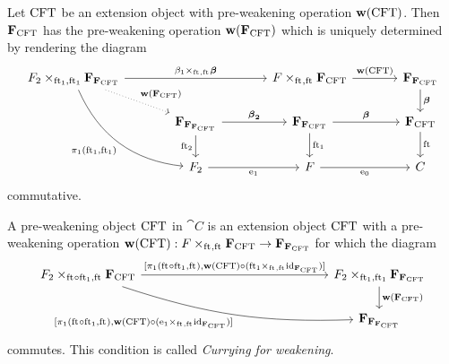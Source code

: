 \begin{defn}
Let $\mathrm{CFT}$ be an extension object with pre-weakening operation
$\mathbf{w}(\mathrm{CFT})$. Then $\mathbf{F}_{\mathrm{CFT}}$ has the pre-weakening operation
$\mathbf{w}(\mathbf{F}_{\mathrm{CFT}})$ which is uniquely determined by rendering the
diagram
\begin{equation*}
\begin{tikzcd}[column sep=large]
\cobesys{\stesysf_2}{\famesys{\famesys{\stesys}}}{\eft[1]}{\eft[1]}
  \ar{rr}{%
      \pullback{\beta_1}{\boldsymbol{\beta}}{\eft}{\eft}
    }
  \ar[bend right]{ddr}[swap]{\pullbackpr{1}{\eft[1]}{\eft[1]}}
  \ar[dotted]{dr}{\mathbf{w}(\famesys{\stesys})}
  &
  {}&
\cobesys{\stesysf}{\famesys{\stesys}}{\eft}{\eft}
  \ar{r}{\mathbf{w}(\stesys)}
  &
\famesys{\famesys{\stesys}}
  \ar{d}{\boldsymbol{\beta}}
  \\
  {}&
\famesys{\famesys{\famesys{\stesys}}}
  \ar{r}{\boldsymbol{\beta}_\mathbf{2}}
  \ar{d}[swap]{\eft[2]}
  &
\famesys{\famesys{\stesys}}
  \ar{d}{\eft[1]}
  \ar{r}{\boldsymbol{\beta}}
  &
\famesys{\stesys}
  \ar{d}{\eft}
  \\
  {}&
\stesysf_2
  \ar{r}[swap]{\efamext}
  &
\stesysf
  \ar{r}[swap]{\ectxext}
  &
\stesysc
\end{tikzcd}
\end{equation*}
commutative.
\end{defn}

\begin{defn}
A pre-weakening object $\mathrm{CFT}$ in $\cat{C}$ is an extension object $\mathrm{CFT}$ 
with a pre-weakening operation 
$ \mathbf{w}(\stesys)
    :
  \cobesys{\stesysf}{\famesys{\stesys}}{\eft}{\eft}
    \to
  \famesys{\famesys{\stesys}}$
for which the diagram
\begin{equation*}
\begin{tikzcd}[column sep=15em]
\cobesys{\stesysf_2}{\famesys{\stesys}}{\eft\circ\eft[1]}{\eft}
  \ar[bend right=10]{dr}[swap]%
    { [ \pullbackpr{1}{\eft\circ\eft[1]}{\eft},%
        \mathbf{w}(\stesys)%
          \circ%
        (\pullback{\efamext}{\catid{\famesys{\stesys}}}{\eft}{\eft})%
        ]%
      }
  \ar{r}{
    [ \pullbackpr{1}{\eft\circ\eft[1]}{\eft},%
      \mathbf{w}(\stesys)%
        \circ%
      (\pullback{\eft[1]}{\catid{\famesys{\stesys}}}{\eft}{\eft})%
      ]}%
  &
\cobesys{\stesysf_2}{\famesys{\famesys{\stesys}}}{\eft[1]}{\eft[1]}
  \ar{d}{\mathbf{w}(\famesys{\stesys})}
  \\
  {}&
\famesys{\famesys{\famesys{\stesys}}}
\end{tikzcd}
\end{equation*}
commutes. This condition is called \emph{Currying for weakening}.
\end{defn}

